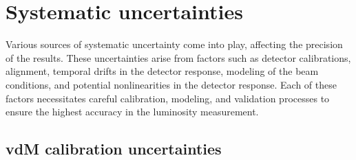 \newpage
\section{Systematic uncertainties}

Various sources of systematic uncertainty come into play, affecting the precision of the results. These uncertainties arise from factors such as detector calibrations, alignment, temporal drifts in the detector response, modeling of the beam conditions, and potential nonlinearities in the detector response. Each of these factors necessitates careful calibration, modeling, and validation processes to ensure the highest accuracy in the luminosity measurement. %

\subsection{vdM calibration uncertainties}

